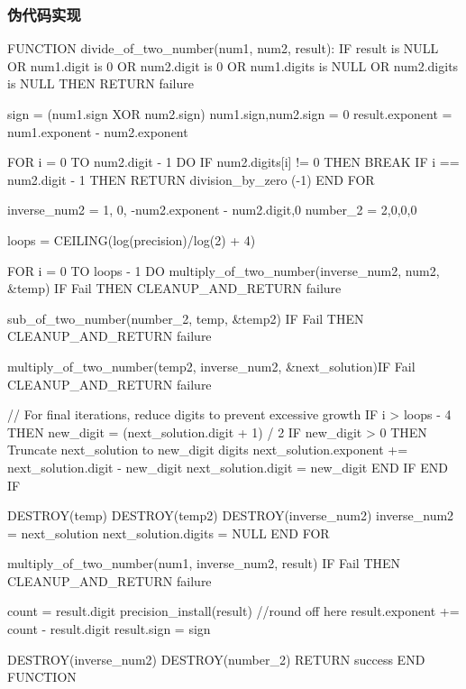 \documentclass[11pt]{article}
\begin{document}
\subsubsection{伪代码实现}
\begin{codeline}
    FUNCTION divide_of_two_number(num1, num2, result):
    IF result is NULL OR num1.digit is 0 OR num2.digit is 0 OR 
       num1.digits is NULL OR num2.digits is NULL THEN
        RETURN failure
    
    sign = (num1.sign XOR num2.sign) 
    num1.sign,num2.sign = 0
    result.exponent = num1.exponent - num2.exponent
    
    FOR i = 0 TO num2.digit - 1 DO
        IF num2.digits[i] != 0 THEN
            BREAK
        IF i == num2.digit - 1 THEN
            RETURN division_by_zero (-1)
    END FOR
    
    inverse_num2 = {{1}, 0, -num2.exponent - num2.digit,0}
    number_2 = {{2},0,0,0}
    
    loops = CEILING(log(precision)/log(2) + 4)
    
    FOR i = 0 TO loops - 1 DO
        multiply_of_two_number(inverse_num2, num2, &temp) IF Fail THEN
            CLEANUP_AND_RETURN failure
            
        sub_of_two_number(number_2, temp, &temp2) IF Fail THEN
            CLEANUP_AND_RETURN failure
            
         multiply_of_two_number(temp2, inverse_num2, &next_solution)IF Fail
            CLEANUP_AND_RETURN failure
        
        // For final iterations, reduce digits to prevent excessive growth
        IF i > loops - 4 THEN
            new_digit = (next_solution.digit + 1) / 2
            IF new_digit > 0 THEN
                Truncate next_solution to new_digit digits
                next_solution.exponent += next_solution.digit - new_digit
                next_solution.digit = new_digit
            END IF
        END IF
        
        DESTROY(temp)
        DESTROY(temp2)
        DESTROY(inverse_num2)
        inverse_num2 = next_solution
        next_solution.digits = NULL 
    END FOR
    
    multiply_of_two_number(num1, inverse_num2, result)  IF Fail THEN
        CLEANUP_AND_RETURN failure
    
    count = result.digit
    precision_install(result) //round off here
    result.exponent += count - result.digit
    result.sign = sign
    
    DESTROY(inverse_num2)
    DESTROY(number_2)
    RETURN success
END FUNCTION
\end{codeline}
\end{document}
